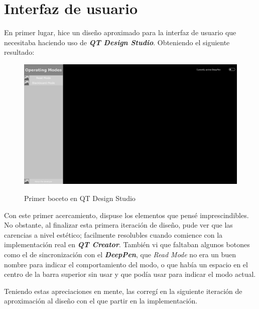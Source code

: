 \chapter{Interfaz de usuario}

En primer lugar, hice un diseño aproximado para la interfaz de usuario que
necesitaba haciendo uso de \textbf{\textit{QT Design Studio}}. Obteniendo el
siguiente resultado:

\begin{figure}[h]
    \centering
    \includegraphics[width=1\textwidth]{capturas/DisenoUsuario1.png}\\[-0,40cm]
    \caption{Primer boceto en QT Design Studio}
    \end{figure}

Con este primer acercamiento, dispuse los elementos que pensé imprescindibles.
No obstante, al finalizar esta primera iteración de diseño, pude ver que las
carencias a nivel estético; facilmente resolubles cuando comience con la
implementación real en \textbf{\textit{QT Creator}}. También vi que faltaban
algunos botones como el de sincronización con el \textbf{\textit{DeepPen}},
que \textit{Read Mode} no era un buen nombre para indicar el comportamiento
del modo, o que había un espacio en el centro de la barra superior sin usar y
que podía usar para indicar el modo actual.

\pagebreak

Teniendo estas apreciaciones en mente, las corregí en la siguiente iteración
de aproximación al diseño con el que partir en la implementación.

